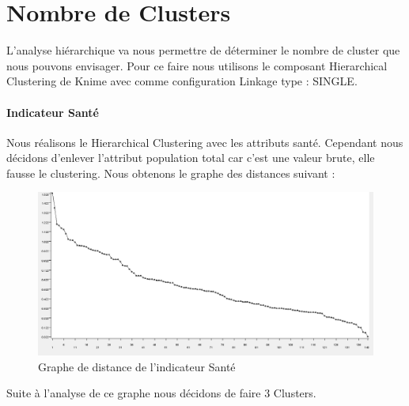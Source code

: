 \section{Nombre de Clusters}
L'analyse hiérarchique va nous permettre de déterminer le nombre de cluster que nous pouvons envisager. Pour ce faire nous utilisons le composant Hierarchical Clustering de Knime avec comme configuration Linkage type : SINGLE.

\paragraph{Indicateur Santé}
Nous réalisons le Hierarchical Clustering avec les attributs santé. Cependant nous décidons d'enlever l'attribut population total car c'est une valeur brute, elle fausse le clustering. Nous obtenons le graphe des distances suivant : 

\begin{figure}[H]
	\begin{center}
		\includegraphics[scale=0.5]{Image/DistanceSanteNoMissing2}
		\caption{Graphe de distance de l'indicateur Santé \jeuc}
	\end{center}
\end{figure}

Suite à l'analyse de ce graphe nous décidons de faire 3 Clusters.

